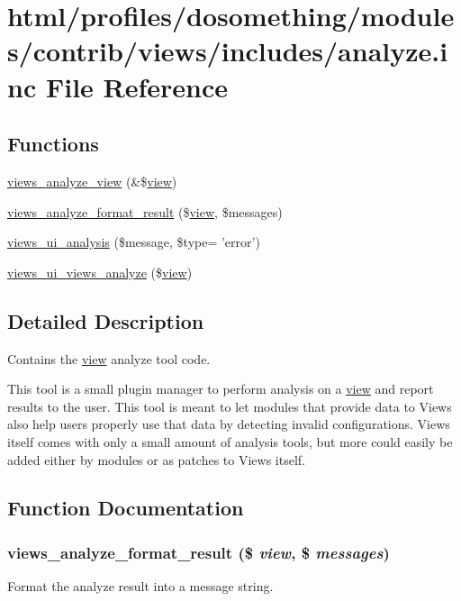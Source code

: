 \hypertarget{analyze_8inc}{
\section{html/profiles/dosomething/modules/contrib/views/includes/analyze.inc File Reference}
\label{analyze_8inc}
}
\subsection*{Functions}
\begin{DoxyCompactItemize}
\item 
\hyperlink{analyze_8inc_a8f418e18d26fe543f6e960bade40a367}{views\_\-analyze\_\-view} (\&\$\hyperlink{classview}{view})
\item 
\hyperlink{analyze_8inc_abb4831d09ff37091c93536f24729a2ad}{views\_\-analyze\_\-format\_\-result} (\$\hyperlink{classview}{view}, \$messages)
\item 
\hyperlink{analyze_8inc_aa4f08098638b001519a0f905b102f22a}{views\_\-ui\_\-analysis} (\$message, \$type= 'error')
\item 
\hyperlink{analyze_8inc_abda4985a58e7461d134687a85c92f65f}{views\_\-ui\_\-views\_\-analyze} (\$\hyperlink{classview}{view})
\end{DoxyCompactItemize}


\subsection{Detailed Description}
Contains the \hyperlink{classview}{view} analyze tool code.

This tool is a small plugin manager to perform analysis on a \hyperlink{classview}{view} and report results to the user. This tool is meant to let modules that provide data to Views also help users properly use that data by detecting invalid configurations. Views itself comes with only a small amount of analysis tools, but more could easily be added either by modules or as patches to Views itself. 

\subsection{Function Documentation}
\hypertarget{analyze_8inc_abb4831d09ff37091c93536f24729a2ad}{
\subsubsection[{views\_\-analyze\_\-format\_\-result}]{\setlength{\rightskip}{0pt plus 5cm}views\_\-analyze\_\-format\_\-result (\$ {\em view}, \/  \$ {\em messages})}}
\label{analyze_8inc_abb4831d09ff37091c93536f24729a2ad}
Format the analyze result into a message string.

